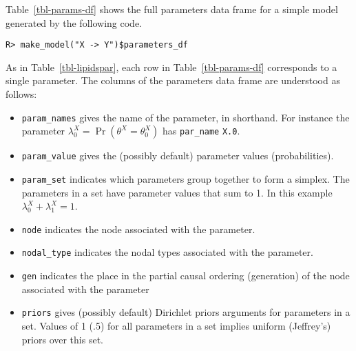 \documentclass[
  11pt,
  article]{jss}
\providecommand{\tightlist}{%
  \setlength{\itemsep}{0pt}\setlength{\parskip}{0pt}}\usepackage{longtable,booktabs,array}
\begin{document}
Table~\ref{tbl-params-df} shows the full parameters data frame for a
simple model generated by the following code.

\begin{verbatim}
R> make_model("X -> Y")$parameters_df
\end{verbatim}

\hypertarget{tbl-params-df}{}
\begin{table}[H]
\caption{\label{tbl-params-df}Example of parameters data frame. }\tabularnewline

\centering
{}
\end{table}

As in Table~\ref{tbl-lipidspar}, each row in Table~\ref{tbl-params-df}
corresponds to a single parameter. The columns of the parameters data
frame are understood as follows:

\begin{itemize}
\tightlist
\item
  \texttt{param\_names} gives the name of the parameter, in shorthand.
  For instance the parameter
  \(\lambda^X_0 = \Pr(\theta^X = \theta^X_0)\) has \texttt{par\_name}
  \texttt{X.0}.
\item
  \texttt{param\_value} gives the (possibly default) parameter values
  (probabilities).
\item
  \texttt{param\_set} indicates which parameters group together to form
  a simplex. The parameters in a set have parameter values that sum to
  1. In this example \(\lambda^X_0 + \lambda^X_1 = 1\).
\item
  \texttt{node} indicates the node associated with the parameter.
\item
  \texttt{nodal\_type} indicates the nodal types associated with the
  parameter.
\item
  \texttt{gen} indicates the place in the partial causal ordering
  (generation) of the node associated with the parameter
\item
  \texttt{priors} gives (possibly default) Dirichlet priors arguments
  for parameters in a set. Values of 1 (.5) for all parameters in a set
  implies uniform (Jeffrey's) priors over this set.
\end{itemize}
\end{document}
